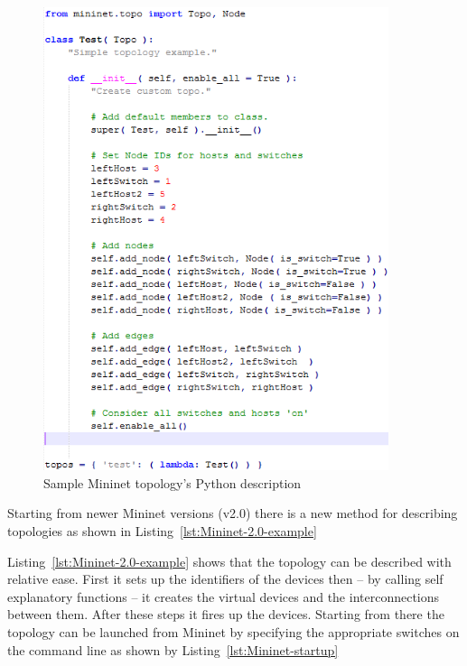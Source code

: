 \documentclass{article}
\begin{document}
\begin{figure}[H]%
    \centering
    \includegraphics[width=0.9\textwidth]{figures/mininet-code.png}
    \caption{Sample Mininet topology's Python description}
    \label{fig:Mininet-sample-topo-code}
\end{figure}

Starting from newer Mininet versions (v2.0) there is a new method for describing topologies as shown in
Listing~\ref{lst:Mininet-2.0-example}



Listing~\ref{lst:Mininet-2.0-example} shows that the topology can be described with relative ease. First it sets up the
identifiers of the devices then -- by calling self explanatory functions -- it creates the virtual devices and the
interconnections between them. After these steps it fires up the devices. Starting from there the topology can be
launched from Mininet by specifying the appropriate switches on the command line as shown by
Listing~\ref{lst:Mininet-startup}
\end{document}
